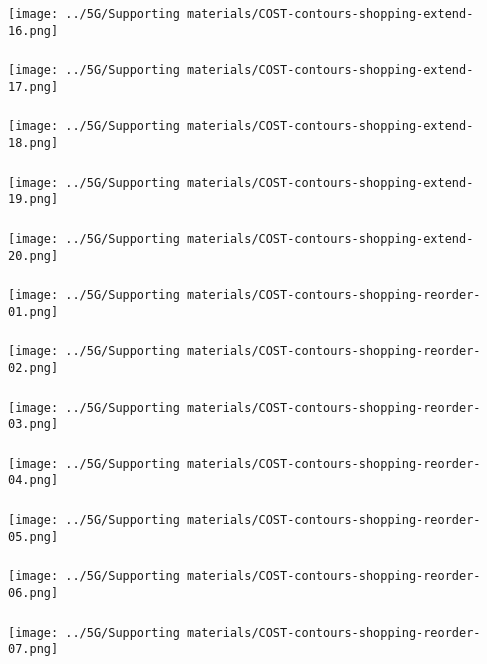 \begin{frame}\frametitle{}
	\centerline{\texttt{[image: ../5G/Supporting materials/COST-contours-shopping-extend-16.png]}}
\end{frame}
\begin{frame}\frametitle{}
	\centerline{\texttt{[image: ../5G/Supporting materials/COST-contours-shopping-extend-17.png]}}
\end{frame}
\begin{frame}\frametitle{}
	\centerline{\texttt{[image: ../5G/Supporting materials/COST-contours-shopping-extend-18.png]}}
\end{frame}
\begin{frame}\frametitle{}
	\centerline{\texttt{[image: ../5G/Supporting materials/COST-contours-shopping-extend-19.png]}}
\end{frame}
\begin{frame}\frametitle{}
	\centerline{\texttt{[image: ../5G/Supporting materials/COST-contours-shopping-extend-20.png]}}
\end{frame}
\begin{frame}\frametitle{}
	\centerline{\texttt{[image: ../5G/Supporting materials/COST-contours-shopping-reorder-01.png]}}
\end{frame}
\begin{frame}\frametitle{}
	\centerline{\texttt{[image: ../5G/Supporting materials/COST-contours-shopping-reorder-02.png]}}
\end{frame}
\begin{frame}\frametitle{}
	\centerline{\texttt{[image: ../5G/Supporting materials/COST-contours-shopping-reorder-03.png]}}
\end{frame}
\begin{frame}\frametitle{}
	\centerline{\texttt{[image: ../5G/Supporting materials/COST-contours-shopping-reorder-04.png]}}
\end{frame}
\begin{frame}\frametitle{}
	\centerline{\texttt{[image: ../5G/Supporting materials/COST-contours-shopping-reorder-05.png]}}
\end{frame}
\begin{frame}\frametitle{}
	\centerline{\texttt{[image: ../5G/Supporting materials/COST-contours-shopping-reorder-06.png]}}
\end{frame}
\begin{frame}\frametitle{}
	\centerline{\texttt{[image: ../5G/Supporting materials/COST-contours-shopping-reorder-07.png]}}
\end{frame}
